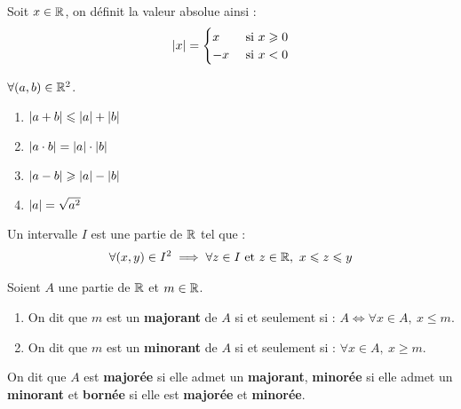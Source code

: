 \begin{definition}
    Soit $x \in \mathbb{R}$, on définit la valeur absolue ainsi :
    \begin{align*}
        \abs{x} =
        \begin{cases}
            x &\text{ si } x \geqslant 0 \\
            -x &\text{ si } x < 0
        \end{cases}
    \end{align*}
\end{definition}

\begin{proposition}
    $\forall (a, b) \in \mathbb{R}^2$.
    \begin{multicols}{2}
        \begin{enumerate}
            \item $\abs{a + b} \leqslant \abs{a} + \abs{b}$
            \item $\abs{a \cdot b} = \abs{a} \cdot \abs{b}$
            \item $\abs{a - b} \geqslant \abs{a} - \abs{b}$
            \item $\abs{a} = \sqrt{a^2}$
        \end{enumerate}
    \end{multicols}
\end{proposition}

\begin{definition}[Intervalle]
    Un intervalle $I$ est une partie de $\mathbb{R}$ tel que :
    \begin{align*}
        \forall (x, y) \in I^2 \implies \forall z \in I \text{ et } z \in \mathbb{R},\ x \leqslant z \leqslant y
    \end{align*}
\end{definition}

\begin{definition}
    Soient $A$ une partie de $\mathbb{R}$ et $m \in \mathbb{R}$.
    \begin{enumerate}
        \item On dit que $m$ est un \textbf{majorant} de $A$ si et seulement si : $A \iff \forall x \in A,\ x \leq m$.
        \item On dit que $m$ est un \textbf{minorant} de $A$ si et seulement si : $\forall x \in A,\ x \geq m$.
    \end{enumerate}
    On dit que $A$ est \textbf{majorée} si elle admet un \textbf{majorant}, \textbf{minorée} si elle admet un \textbf{minorant} et \textbf{bornée} si elle est \textbf{majorée} et \textbf{minorée}.
\end{definition}

